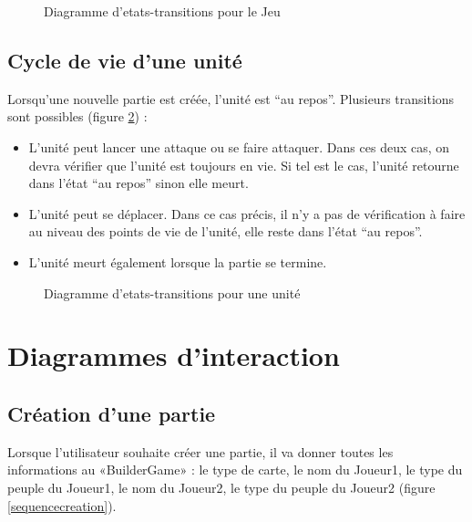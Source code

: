 \documentclass[a4paper]{article}
\begin{document}
\begin{figure}[!h] 
  \begin{center}
    \caption{Diagramme d'etats-transitions pour le Jeu} 
    \label{etattransjeu} 
  \end{center}
\end{figure}

\subsection{Cycle de vie d’une unité}

Lorsqu’une nouvelle partie est créée, l’unité est “au repos”. Plusieurs transitions sont possibles (figure \ref{etattransunite}) :
\begin{itemize}\renewcommand{\labelitemi}{$\bullet$}
	\item L’unité peut lancer une attaque ou se faire attaquer. Dans ces deux cas, on devra vérifier que l’unité est toujours en vie. Si tel est le cas, l’unité retourne dans l’état “au repos” sinon elle meurt.
	\item L’unité peut se déplacer. Dans ce cas précis, il n’y a pas de vérification à faire au niveau des points de vie de l’unité, elle reste dans l’état “au repos”.
	\item L’unité meurt également lorsque la partie se termine.
\end{itemize}

\begin{figure}[!h] 
  \begin{center}
    \caption{Diagramme d'etats-transitions pour une unité} 
    \label{etattransunite} 
  \end{center}
\end{figure}

\newpage

\section{Diagrammes d’interaction}
 
\subsection{Création d’une partie}

Lorsque l’utilisateur souhaite créer une partie, il va donner toutes les informations au «BuilderGame» : le type de carte, le nom du Joueur1, le type du peuple du Joueur1, le nom du Joueur2, le type du peuple du Joueur2 (figure \ref{sequencecreation}).
\end{document}
